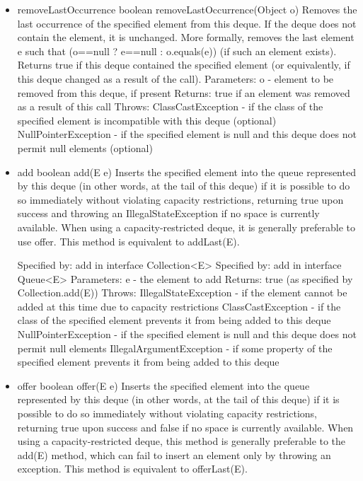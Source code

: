 \documentclass{book}
\begin{document}
\begin{itemize}
	\item removeLastOccurrence
	boolean removeLastOccurrence(Object o)
	Removes the last occurrence of the specified element from this deque. If the deque does not contain the element, it is unchanged. More formally, removes the last element e such that (o==null ? e==null : o.equals(e)) (if such an element exists). Returns true if this deque contained the specified element (or equivalently, if this deque changed as a result of the call).
	Parameters:
	o - element to be removed from this deque, if present
	Returns:
	true if an element was removed as a result of this call
	Throws:
	ClassCastException - if the class of the specified element is incompatible with this deque (optional)
	NullPointerException - if the specified element is null and this deque does not permit null elements (optional)
	
	\item add
	boolean add(E e)
	Inserts the specified element into the queue represented by this deque (in other words, at the tail of this deque) if it is possible to do so immediately without violating capacity restrictions, returning true upon success and throwing an IllegalStateException if no space is currently available. When using a capacity-restricted deque, it is generally preferable to use offer.
	This method is equivalent to addLast(E).
	
	Specified by:
	add in interface Collection<E>
	Specified by:
	add in interface Queue<E>
	Parameters:
	e - the element to add
	Returns:
	true (as specified by Collection.add(E))
	Throws:
	IllegalStateException - if the element cannot be added at this time due to capacity restrictions
	ClassCastException - if the class of the specified element prevents it from being added to this deque
	NullPointerException - if the specified element is null and this deque does not permit null elements
	IllegalArgumentException - if some property of the specified element prevents it from being added to this deque
	
	\item offer
	boolean offer(E e)
	Inserts the specified element into the queue represented by this deque (in other words, at the tail of this deque) if it is possible to do so immediately without violating capacity restrictions, returning true upon success and false if no space is currently available. When using a capacity-restricted deque, this method is generally preferable to the add(E) method, which can fail to insert an element only by throwing an exception.
	This method is equivalent to offerLast(E).
	

\end{itemize}
\end{document}
